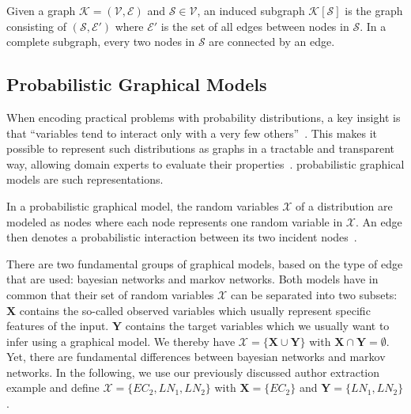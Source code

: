 Given a \gls{graph} $\mathcal{K} = (\mathcal{V},\mathcal{E})$ and $\mathcal{S}\in\mathcal{V}$, an induced \gls{subgraph} $\mathcal{K}[\mathcal{S}]$ is the \gls{graph} consisting of $(\mathcal{S},\mathcal{E'})$ where $\mathcal{E'}$ is the set of all \glspl{edge} between \glspl{node} in $\mathcal{S}$.
In a complete \gls{subgraph}, every two \glspl{node} in $\mathcal{S}$ are connected by an \gls{edge}.

\subsection{Probabilistic Graphical Models}\label{subsec:graphical-models}
When encoding practical problems with \glspl{probability distribution}, a key insight is that ``variables tend to interact only with a very few others''~\citep{koller2009probabilistic}.
This makes it possible to represent such distributions as graphs in a tractable and transparent way, allowing domain experts to evaluate their properties~\citep{koller2009probabilistic}.
\Glspl{probabilistic graphical model} are such representations.

\bigskip

In a \gls{probabilistic graphical model}, the \glspl{random variable} $\mathcal{X}$ of a distribution are modeled as \glspl{node} where each \gls{node} represents one \gls{random variable} in $\mathcal{X}$. An \gls{edge} then denotes a probabilistic interaction between its two incident \glspl{node}~\citep{koller2009probabilistic}.

There are two fundamental groups of graphical models, based on the type of edge that are used: \glspl{bayesian network} and \glspl{markov network}.
Both models have in common that their set of \glspl{random variable} $\mathcal{X}$ can be separated into two subsets:
$\mathbf{X}$ contains the so-called \glspl{observed variable} which usually represent specific features of the input.
$\mathbf{Y}$ contains the \glspl{target variable} which we usually want to infer using a graphical model.
We thereby have $\mathcal{X}=\{\mathbf{X}\cup\mathbf{Y}\}$ with $\mathbf{X}\cap\mathbf{Y}=\emptyset$.
Yet, there are fundamental differences between \glspl{bayesian network} and \glspl{markov network}.
In the following, we use our previously discussed author extraction example and define $\mathcal{X}=\{EC_2,LN_1,LN_2\}$ with $\mathbf{X}=\{EC_2\}$ and $\mathbf{Y}=\{LN_1,LN_2\}$.


